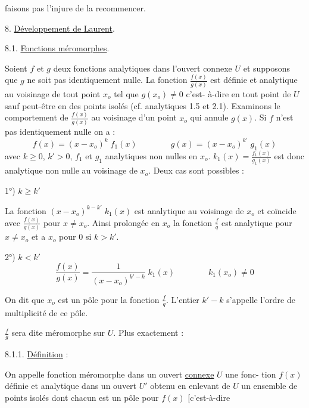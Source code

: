 
faisons pas l'injure de la recommencer.

8. \uline{Développement de Laurent}.

8.1. \uline{Fonctions méromorphes}.

Soient $f$ et $g$ deux fonctions analytiques dans l'ouvert connexe $U$
et supposons que $g$ ne soit pas identiquement nulle. La fonction $\frac{f(x)}{g(x)}$ est
définie et analytique au voisinage de tout point $x_o$ tel que $g(x_o) \neq 0$ c'est-%
à-dire en tout point de $U$ sauf peut-être en des points isolés (cf. 
analytiques 1.5 et 2.1). Examinons le comportement de $\frac{f(x)}{g(x)}$ au voisinage d'un
point $x_o$ qui annule $g(x)$. Si $f$ n'est pas identiquement nulle on a :
\[ f(x) = (x - x_o)^k \; f_1(x) \qquad\qquad g(x) = (x - x_o)^{k'} \; g_1(x) \]
avec $k \geq 0$, $k' > 0$, $f_1$ et $g_1$ analytiques non nulles en $x_o$. $k_1(x) = \frac{f_1(x)}{g_1(x)}$
est donc analytique non nulle au voisinage de $x_o$.
Deux cas sont possibles :

1°) \uline{$k \geq k'$}

La fonction $(x - x_o)^{k-k'} \; k_1(x)$ est analytique au voisinage de $x_o$
et coïncide avec $\frac{f(x)}{g(x)}$ pour $x \neq x_o$. Ainsi prolongée en $x_o$ la fonction $\frac{f}{q}$
est analytique pour $x \neq x_o$ et a $x_o$ pour 0 si $k > k'$.

2°) \uline{$k < k'$}
\[ \frac{f(x)}{g(x)} = \frac{1}{(x-x_o)^{k'-k}} \; k_1(x) \qquad\qquad k_1(x_o) \neq 0 \]

On dit que $x_o$ est un pôle pour la fonction $\frac{f}{q}$. L'entier $k'-k$ s'appelle
l'ordre de multiplicité de ce pôle.

$\frac{f}{g}$ sera dite méromorphe sur $U$. Plus exactement :

8.1.1. \uline{Définition} :

On appelle fonction méromorphe dans un ouvert \uline{connexe} $U$ une fonc-%
tion $f(x)$ définie et analytique dans un ouvert $U'$ obtenu en enlevant de $U$
un ensemble de points isolés dont chacun est un pôle pour $f(x)$ [c'est-à-dire

